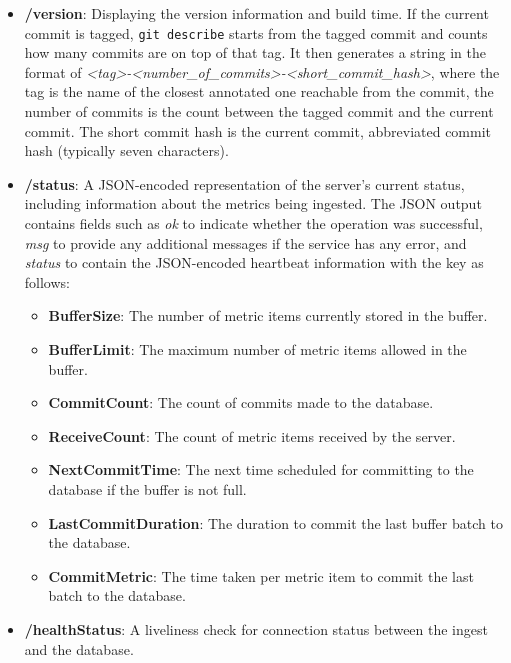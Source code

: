 \begin{itemize}
    \item \textbf{/version}: Displaying the version information and build time. If the current commit is tagged, \texttt{git describe} starts from the tagged commit and counts how many commits are on top of that tag. It then generates a string in the format of \textit{<tag>-<number\_of\_commits>-<short\_commit\_hash>}, where the tag is the name of the closest annotated one reachable from the commit, the number of commits is the count between the tagged commit and the current commit. The short commit hash is the current commit, abbreviated commit hash (typically seven characters).
    \item \textbf{/status}: A JSON-encoded representation of the server's current status, including information about the metrics being ingested. The JSON output contains fields such as \textit{ok} to indicate whether the operation was successful, \textit{msg} to provide any additional messages if the service has any error, and \textit{status} to contain the JSON-encoded heartbeat information with the key as follows:
    \begin{itemize}
        \item \textbf{BufferSize}: The number of metric items currently stored in the buffer.
        \item \textbf{BufferLimit}: The maximum number of metric items allowed in the buffer.
        \item \textbf{CommitCount}: The count of commits made to the database.
        \item \textbf{ReceiveCount}: The count of metric items received by the server.
        \item \textbf{NextCommitTime}: The next time scheduled for committing to the database if the buffer is not full.
        \item \textbf{LastCommitDuration}: The duration to commit the last buffer batch to the database.
        \item \textbf{CommitMetric}: The time taken per metric item to commit the last batch to the database.
    \end{itemize}
    \item \textbf{/healthStatus}: A liveliness check for connection status between the ingest and the database.
\end{itemize}

